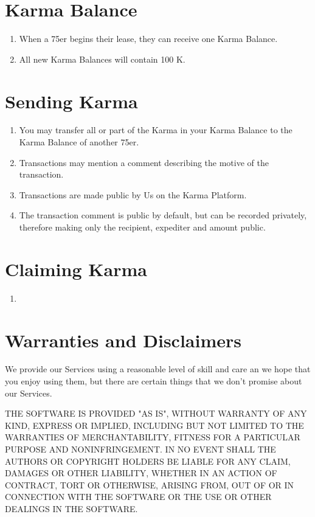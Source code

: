 \documentclass[12pt,a4paper]{article}
\begin{document}
\section{Karma Balance}

\begin{enumerate}
	\item When a 75er begins their lease, they can receive one Karma Balance.
	\item All new Karma Balances will contain 100 K.

\end{enumerate}

\section{Sending Karma}

\begin{enumerate}
	\item You may transfer all or part of the Karma in your Karma Balance to the Karma Balance of another 75er. 
	\item Transactions may mention a comment describing the motive of the transaction.
	\item Transactions are made public by Us on the Karma Platform. 
	\item The transaction comment is public by default, but can be recorded privately, therefore making only the recipient, expediter and amount public.
\end{enumerate}

\section{Claiming Karma}

\begin{enumerate}
	\item 
\end{enumerate}

\section{Warranties and Disclaimers}

We provide our Services using a reasonable level of skill and care an we hope that you enjoy using them, but there are certain things that we don't promise about our Services.

THE SOFTWARE IS PROVIDED "AS IS", WITHOUT WARRANTY OF ANY KIND, EXPRESS OR
IMPLIED, INCLUDING BUT NOT LIMITED TO THE WARRANTIES OF MERCHANTABILITY,
FITNESS FOR A PARTICULAR PURPOSE AND NONINFRINGEMENT. IN NO EVENT SHALL THE
AUTHORS OR COPYRIGHT HOLDERS BE LIABLE FOR ANY CLAIM, DAMAGES OR OTHER
LIABILITY, WHETHER IN AN ACTION OF CONTRACT, TORT OR OTHERWISE, ARISING FROM,
OUT OF OR IN CONNECTION WITH THE SOFTWARE OR THE USE OR OTHER DEALINGS IN THE
SOFTWARE.
\end{document}
